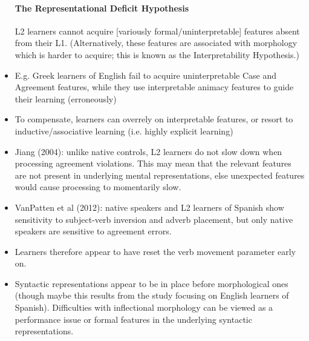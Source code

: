 \documentclass{article}
\begin{document}
\begin{itemize}
    \paragraph{The Representational Deficit Hypothesis} L2 learners cannot acquire [variously formal/uninterpretable] features absent from their L1. (Alternatively, these features are associated with morphology which is harder to acquire; this is known as the Interpretability Hypothesis.)
    \item E.g. Greek learners of English fail to acquire uninterpretable Case and Agreement features, while they use interpretable animacy features to guide their learning (erroneously)
    \item To compensate, learners can overrely on interpretable features, or resort to inductive/associative learning (i.e. highly explicit learning)
    \item Jiang (2004): unlike native controls, L2 learners do not slow down when processing agreement violations. This may mean that the relevant features are not present in underlying mental representations, else unexpected features would cause processing to momentarily slow.
    \item VanPatten et al (2012): native speakers and L2 learners of Spanish show sensitivity to subject-verb inversion and adverb placement, but only native speakers are sensitive to agreement errors.
    \item Learners therefore appear to have reset the verb movement parameter early on.
    \item Syntactic representations appear to be in place before morphological ones (though maybe this results from the study focusing on English learners of Spanish). Difficulties with inflectional morphology can be viewed as a performance issue or formal features in the underlying syntactic representations.
\end{itemize}
\end{document}
